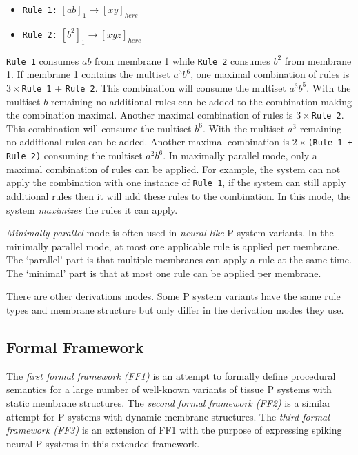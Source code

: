 \documentclass{article}
\begin{document}
\begin{itemize}
\item \texttt{Rule 1:} $[ab]_1 \rightarrow [xy]_{here}$
\item \texttt{Rule 2:} $[b^2]_1 \rightarrow [xyz]_{here}$ 
\end{itemize}

\texttt{Rule 1} consumes $ab$ from membrane 1 while \texttt{Rule 2} consumes $b^2$
from membrane 1. If membrane 1 contains the multiset $a^3b^6$, one maximal combination of rules is
$3 \times$\texttt{Rule 1} + \texttt{Rule 2}. This combination will consume the multiset $a^3b^5$.
With the multiset $b$ remaining no additional rules can be added to the combination making the
combination maximal. Another maximal combination of rules is $3\times$\texttt{Rule 2}. This
combination will consume the multiset $b^6$. With the multiset $a^3$ remaining no additional rules
can be added. Another maximal combination is $2\times$\texttt{(Rule 1 + Rule 2)} consuming the
multiset $a^2b^6$. In maximally parallel mode, only a maximal combination of rules can be applied.
For example, the system can not apply the combination with one instance of \texttt{Rule 1}, if the
system can still apply additional rules then it will add these rules to the combination. In this
mode, the system \textit{maximizes} the rules it can apply.

\textit{Minimally parallel} mode is often used in \textit{neural-like} P system variants. In the
minimally parallel mode, at most one applicable rule is applied per membrane. The `parallel' part is
that multiple membranes can apply a rule at the same time. The `minimal' part is that at most one
rule can be applied per membrane.

There are other derivations modes. Some P system variants have the same rule types and membrane
structure but only differ in the derivation modes they use.


\subsection{Formal Framework}

The \emph{first formal framework (FF1)} \cite{ff-static} is an attempt to formally define procedural
semantics for a large number of well-known variants of tissue P systems with static membrane 
structures. The \emph{second formal framework (FF2)} \cite{ff-dynamic} is a similar attempt for P 
systems with dynamic membrane structures. The \emph{third formal framework (FF3)} \cite{ff-snp} is 
an extension of FF1 with the purpose of expressing spiking neural P systems \cite{snp} in this
extended framework.
\end{document}
